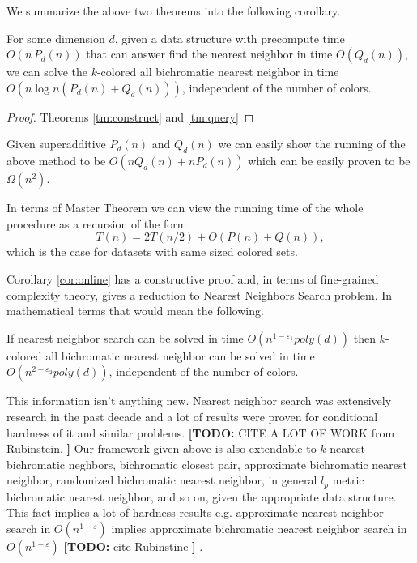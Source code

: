\documentclass[a4paper,UKenglish,cleveref, autoref, thm-restate]{lipics-v2021}
\newcommand{\nota}[3]{{%
		\color{#2}
		\marginpar{\color{#2!75!black}\textbf\texttimes}%
		\textsf{\textbf{[\textbullet#1:}
			\textsf{\small#3}
			\textbf{\textbullet]}}%
}}
\newcommand{\todo}[1]{\nota{TODO}{red!55!black}{#1}}
\begin{document}
We summarize the above two theorems into the following corollary.
\begin{corollary}\label{cor:online}
For some dimension $d$, given a data structure with precompute time $O\left(n\, P_d(n)\right)$
that can answer find the nearest neighbor in time $O\left(Q_d(n)\right)$, we can solve the $k$-colored all bichromatic nearest neighbor in time $O\left(n \log n \left(P_d(n) + Q_d(n)\right)\right)$, independent of the number of colors.
\end{corollary}
\begin{proof} Theorems \ref{tm:construct} and \ref{tm:query} \end{proof}
\begin{remark}
Given superadditive $P_d(n)$ and $Q_d(n)$ we can easily show the running of the above method to be $O(nQ_d(n) + nP_d(n))$ which can be easily proven to be $\Omega(n^2)$.
\end{remark}
\begin{remark}
In terms of Master Theorem we can view the running time of the whole procedure as a recursion of the form
$$ T(n) = 2T(n/2) + O(P(n) + Q(n)), $$
which is the case for datasets with same sized colored sets.
\end{remark}

Corollary \ref{cor:online} has a constructive proof and, in terms of fine-grained complexity theory, gives a reduction to Nearest Neighbors Search problem.
In mathematical terms that would mean the following.
\begin{corollary}
If nearest neighbor search can be solved in time $O(n^{1-\varepsilon_1}poly(d))$ then $k$-colored all bichromatic nearest neighbor can be solved in time $O(n^{2-\varepsilon_2}poly(d))$, independent of the number of colors.
\end{corollary}
This information isn't anything new.
Nearest neighbor search was extensively research in the past decade and a lot of results were proven for conditional hardness of it and similar problems.
\todo{CITE A LOT OF WORK from Rubinstein.}
Our framework given above is also extendable to $k$-nearest bichromatic neghbors, bichromatic closest pair, approximate bichromatic nearest neighbor, randomized bichromatic nearest neighbor, in general $l_p$ metric bichromatic nearest neighbor, and so on, given the appropriate data structure.
This fact implies a lot of hardness results e.g. approximate nearest neighbor search in $O(n^{1-\varepsilon})$ implies approximate bichromatic nearest neighbor search in $O(n^{1-\varepsilon})$\todo{cite Rubinstine}.
\end{document}

